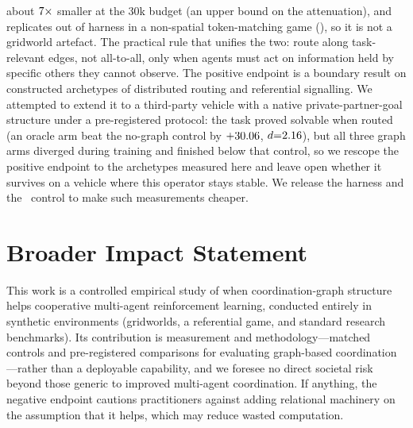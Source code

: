 about $7\times$ smaller at the 30k budget (an upper bound on the
attenuation), and replicates out of harness in a
non-spatial token-matching game (\tokenmatch), so it is not a gridworld
artefact. The practical rule that unifies the two: route along task-relevant
edges, not all-to-all, only when agents must act on information held by
specific others they cannot observe. The positive endpoint is a boundary
result on constructed archetypes of distributed routing and referential
signalling. We attempted to extend it to a third-party vehicle with a native
private-partner-goal structure under a pre-registered protocol: the task proved
solvable when routed (an oracle arm beat the no-graph control by
$+30.06$, $d{=}2.16$), but all three graph arms diverged during
training and finished below that control, so we rescope the positive endpoint
to the archetypes measured here and leave open whether it survives on a vehicle
where this operator stays stable. We release the harness and the \mlpqmix\
control to make such measurements cheaper.

\section*{Broader Impact Statement}

This work is a controlled empirical study of when coordination-graph
structure helps cooperative multi-agent reinforcement learning, conducted
entirely in synthetic environments (gridworlds, a referential game, and
standard research benchmarks). Its contribution is measurement and
methodology---matched controls and pre-registered comparisons for evaluating
graph-based coordination---rather than a deployable capability, and we
foresee no direct societal risk beyond those generic to improved multi-agent
coordination. If anything, the negative endpoint cautions practitioners
against adding relational machinery on the assumption that it helps, which
may reduce wasted computation.


\backmatter


